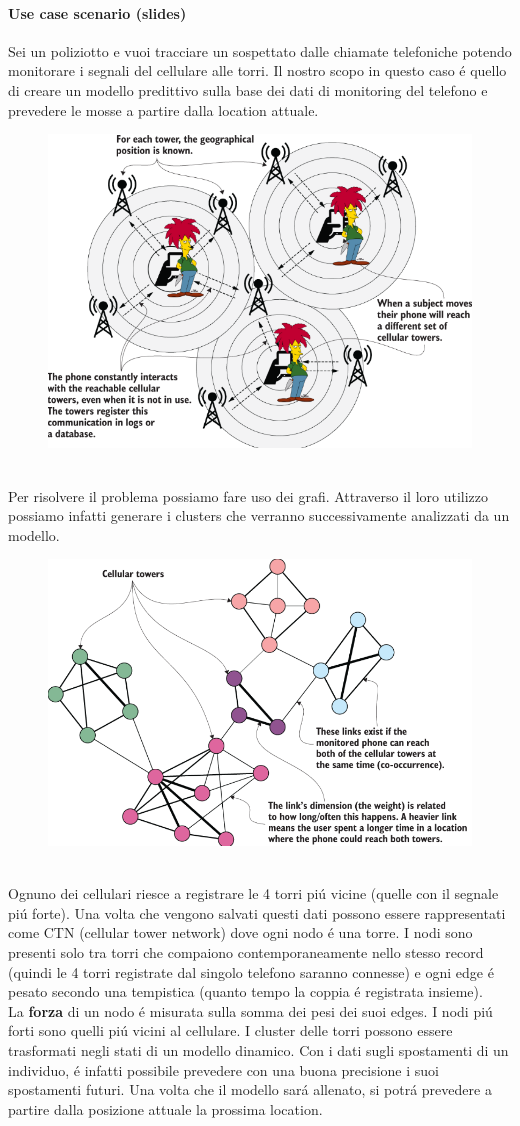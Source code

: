 \paragraph{Use case scenario (slides)} Sei un poliziotto e vuoi tracciare un sospettato dalle chiamate telefoniche potendo monitorare i segnali del cellulare alle torri. Il nostro scopo in questo caso é quello di creare un modello predittivo sulla base dei dati di monitoring del telefono e prevedere le mosse a partire dalla location attuale. 
\\
\begin{figure}[th]
    \centering
    \includegraphics[width=0.5\linewidth]{ML&Graphs//img/esempiobob.png}
\end{figure}
\\
Per risolvere il problema possiamo fare uso dei grafi. Attraverso il loro utilizzo possiamo infatti generare i clusters che verranno successivamente analizzati da un modello. 
\\
\begin{figure}[th]
    \centering
    \includegraphics[width=0.5\linewidth]{GraphDataEngineering//img/esempioclusters.png}
\end{figure}
\\
Ognuno dei cellulari riesce a registrare le 4 torri piú vicine (quelle con il segnale piú forte). Una volta che vengono salvati questi dati possono essere rappresentati come CTN (cellular tower network) dove ogni nodo é una torre. I nodi sono presenti solo tra torri che compaiono contemporaneamente nello stesso record (quindi le 4 torri registrate dal singolo telefono saranno connesse) e ogni edge é pesato secondo una tempistica (quanto tempo la coppia é registrata insieme). \\
La \textbf{forza} di un nodo é misurata sulla somma dei pesi dei suoi edges. I nodi piú forti sono quelli piú vicini al cellulare. I cluster delle torri possono essere trasformati negli stati di un modello dinamico. Con i dati sugli spostamenti di un individuo, é infatti possibile prevedere con una buona precisione i suoi spostamenti futuri. Una volta che il modello sará allenato, si potrá prevedere a partire dalla posizione attuale la prossima location. 


